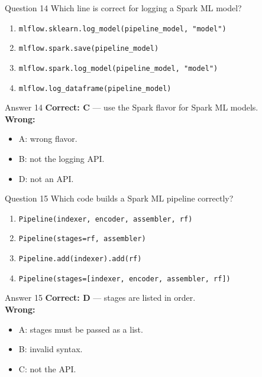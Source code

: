 \documentclass[aspectratio=169,11pt]{beamer}
\begin{document}
\begin{frame}{Question 14}
Which line is correct for logging a Spark ML model?
\begin{enumerate}[label=\Alph*.]
\item \texttt{mlflow.sklearn.log\_model(pipeline\_model, "model")}
\item \texttt{mlflow.spark.save(pipeline\_model)}
\item \texttt{mlflow.spark.log\_model(pipeline\_model, "model")}
\item \texttt{mlflow.log\_dataframe(pipeline\_model)}
\end{enumerate}
\end{frame}
\begin{frame}{Answer 14}
\textbf{Correct: C} --- use the Spark flavor for Spark ML models.\\
\vspace{0.5em}
\textbf{Wrong:}
\begin{itemize}
\item A: wrong flavor.
\item B: not the logging API.
\item D: not an API.
\end{itemize}
\end{frame}

\begin{frame}{Question 15}
Which code builds a Spark ML pipeline correctly?
\begin{enumerate}[label=\Alph*.]
\item \texttt{Pipeline(indexer, encoder, assembler, rf)}
\item \texttt{Pipeline(stages=rf, assembler)}
\item \texttt{Pipeline.add(indexer).add(rf)}
\item \texttt{Pipeline(stages=[indexer, encoder, assembler, rf])}
\end{enumerate}
\end{frame}
\begin{frame}{Answer 15}
\textbf{Correct: D} --- stages are listed in order.\\
\vspace{0.5em}
\textbf{Wrong:}
\begin{itemize}
\item A: stages must be passed as a list.
\item B: invalid syntax.
\item C: not the API.
\end{itemize}
\end{frame}
\end{document}
